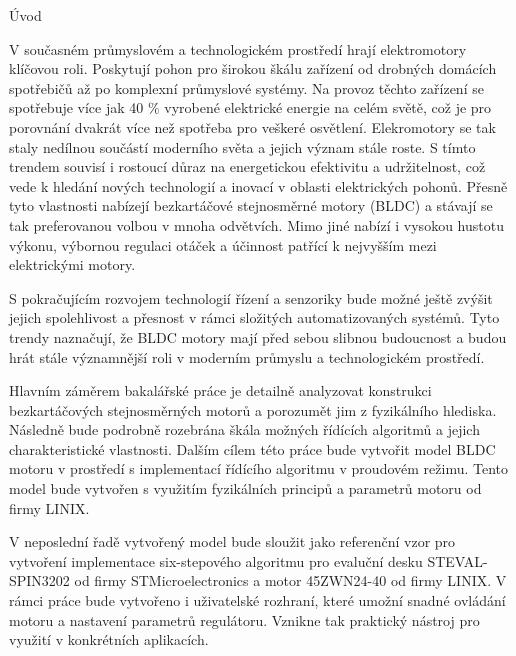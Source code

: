 
\chap Úvod



V současném průmyslovém a technologickém prostředí hrají elektromotory klíčovou roli. Poskytují pohon pro širokou 
škálu zařízení od drobných domácích spotřebičů až po komplexní průmyslové systémy.
Na provoz těchto zařízení se spotřebuje více jak 40 \% vyrobené elektrické energie na celém světě,
což je pro porovnání dvakrát více než spotřeba pro veškeré osvětlení. 
Elekromotory se tak staly nedílnou součástí moderního světa a jejich význam stále roste.
S tímto trendem souvisí i rostoucí důraz na energetickou efektivitu a udržitelnost, což vede k hledání nových technologií a
inovací v oblasti elektrických pohonů. Přesně tyto vlastnosti nabízejí bezkartáčové stejnosměrné motory (BLDC) a stávají se tak
preferovanou volbou v mnoha odvětvích. Mimo jiné nabízí i vysokou hustotu výkonu, výbornou 
regulaci otáček a účinnost patřící k nejvyšším mezi elektrickými motory.

S pokračujícím rozvojem technologií řízení a senzoriky bude možné ještě zvýšit jejich spolehlivost a přesnost v rámci 
složitých automatizovaných systémů. Tyto trendy naznačují, že BLDC motory mají před sebou 
slibnou budoucnost a budou hrát stále významnější roli v moderním průmyslu a technologickém prostředí.

Hlavním záměrem bakalářské práce je detailně analyzovat konstrukci bezkartáčových stejnosměrných motorů a porozumět 
jim z fyzikálního hlediska. Následně bude podrobně rozebrána škála možných řídících algoritmů a jejich charakteristické
vlastnosti. Dalším cílem této práce bude vytvořit model BLDC motoru v prostředí  s implementací 
řídícího algoritmu v proudovém režimu. Tento model bude vytvořen s využitím fyzikálních principů a parametrů motoru od 
firmy LINIX.

V neposlední řadě vytvořený model bude sloužit jako referenční vzor pro vytvoření implementace six-stepového algoritmu pro evaluční 
desku STEVAL-\nobreak{}SPIN3202 od firmy STMicroelectronics a motor 45ZWN24-40 od firmy LINIX. V rámci práce bude vytvořeno i uživatelské rozhraní, které 
umožní snadné ovládání motoru a nastavení parametrů regulátoru. Vznikne tak 
praktický nástroj pro využití v konkrétních aplikacích. 


